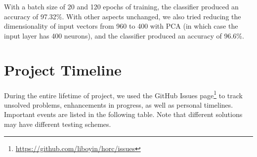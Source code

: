 \documentclass[11pt,a4paper]{article}
\begin{document}
With a batch size of 20 and 120 epochs of training, the classifier produced an accuracy of 97.32\%. With other aspects unchanged, we also tried reducing the dimensionality of input vectors from 960 to 400 with PCA (in which case the input layer has 400 neurons), and the classifier produced an accuracy of 96.6\%.

\section{Project Timeline}

During the entire lifetime of project, we used the GitHub Issues page\footnote{\url{https://github.com/liboyin/horc/issues}} to track unsolved problems, enhancements in progress, as well as personal timelines. Important events are listed in the following table. Note that different solutions may have different testing schemes.
\end{document}
